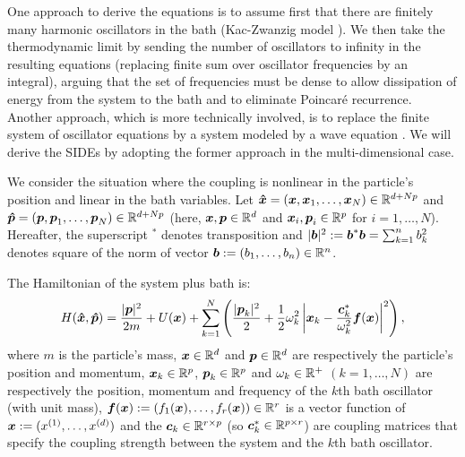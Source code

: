 One approach to derive the equations is to assume first that there are finitely many harmonic oscillators in the bath (Kac-Zwanzig model \citep{zwanzig2001nonequilibrium,ariel2008strong}). We then take the thermodynamic limit by sending the number of oscillators to infinity in the resulting equations (replacing finite sum over oscillator frequencies by an integral), arguing that the set of frequencies must be dense to allow dissipation of energy from the system to the bath and to eliminate Poincar\'e recurrence. Another approach, which is more technically involved, is to replace the finite system of oscillator equations by a system modeled by a wave equation \citep{rey2006open,pavliotis2014stochastic}. We will derive the SIDEs by adopting the former approach in the multi-dimensional case. 

We consider the situation where the coupling is nonlinear in the particle's position  and linear in the bath variables. Let $\boldsymbol{\hat{x}} = (\boldsymbol{x}, \boldsymbol{x}_{1}, \dots, \boldsymbol{x}_{N}) \in \mathbb{R}^{d+N p}$ and $\boldsymbol{\hat{p}} = (\boldsymbol{p}, \boldsymbol{p}_{1}, \dots, \boldsymbol{p}_{N}) \in \mathbb{R}^{d+Np}$ (here, $\boldsymbol{x}, \boldsymbol{p} \in \mathbb{R}^d$ and $\boldsymbol{x}_i, \boldsymbol{p}_i \in \mathbb{R}^p$ for $i=1,\dots,N$). Hereafter, the superscript $^*$ denotes transposition and $|\boldsymbol{b}|^2 := \boldsymbol{b}^* \boldsymbol{b} = \sum_{k=1}^{n} b_k^2$ denotes square of the norm of vector $\boldsymbol{b} := (b_1, \dots, b_n) \in \mathbb{R}^n$. 

The Hamiltonian of the system plus bath is:
\begin{equation}H(\boldsymbol{\hat{x}},\boldsymbol{\hat{p}}) = \frac{|\boldsymbol{p}|^2}{2m} + U(\boldsymbol{x}) + \sum_{k=1}^{N} \left( \frac{|\boldsymbol{p}_{k}|^2}{2} + \frac{1}{2} \omega_{k}^2 \left| \boldsymbol{x}_{k}-\frac{\boldsymbol{c}^*_{k}}{\omega_{k}^2}\boldsymbol{f}(\boldsymbol{x}) \right|^2 \right) , \end{equation}
where $m$ is the particle's mass, $\boldsymbol{x} \in \mathbb{R}^{d}$ and $\boldsymbol{p} \in \mathbb{R}^{d}$ are respectively the particle's position  and  momentum, $\boldsymbol{x}_{k} \in \mathbb{R}^{p}$, $\boldsymbol{p}_{k} \in \mathbb{R}^{p}$  and $\omega_{k} \in \mathbb{R}^{+}$ $(k=1,\dots,N)$ are respectively the position, momentum and frequency of the $k$th bath oscillator (with unit mass), $\boldsymbol{f}(\boldsymbol{x}) := (f_{1}(\boldsymbol{x}), \dots, f_{r}(\boldsymbol{x})) \in \mathbb{R}^r$ is a vector function of $\boldsymbol{x} := (x^{(1)}, \dots, x^{(d)})$ and the $\boldsymbol{c}_{k} \in \mathbb{R}^{r \times p}$ (so $\boldsymbol{c}_k^* \in \mathbb{R}^{p \times r}$) are  coupling matrices that specify the coupling strength between the system and the $k$th bath oscillator. 



